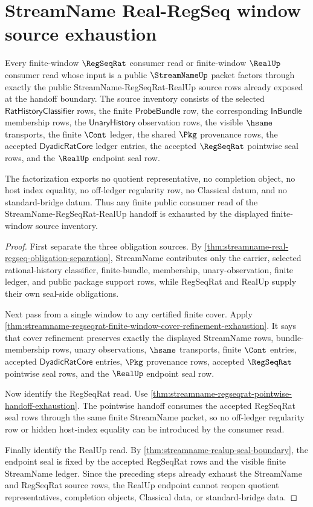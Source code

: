 \section{StreamName Real-RegSeq window source exhaustion}
\label{sec:streamname-real-regseq-window-source-exhaustion}

\begin{theorem}
\label{thm:streamname-real-regseq-window-source-exhaustion}
Every finite-window $\RegSeqRat$ consumer read or finite-window $\RealUp$
consumer read whose input is a public $\StreamNameUp$ packet factors through
exactly the public StreamName-RegSeqRat-RealUp source rows already exposed at
the handoff boundary. The source inventory consists of the selected
$\mathsf{RatHistoryClassifier}$ rows, the finite $\mathsf{ProbeBundle}$ row,
the corresponding $\mathsf{InBundle}$ membership rows, the
$\mathsf{UnaryHistory}$ observation rows, the visible $\hsame$ transports, the
finite $\Cont$ ledger, the shared $\Pkg$ provenance rows, the accepted
$\mathsf{DyadicRatCore}$ ledger entries, the accepted $\RegSeqRat$ pointwise
seal rows, and the $\RealUp$ endpoint seal row.

The factorization exports no quotient representative, no completion object, no
host index equality, no off-ledger regularity row, no Classical datum, and no
standard-bridge datum. Thus any finite public consumer read of the
StreamName-RegSeqRat-RealUp handoff is exhausted by the displayed finite-window
source inventory.
\end{theorem}
\begin{proof}
First separate the three obligation sources. By
\autoref{thm:streamname-real-regseq-obligation-separation}, StreamName
contributes only the carrier, selected rational-history classifier,
finite-bundle, membership, unary-observation, finite ledger, and public package
support rows, while RegSeqRat and RealUp supply their own seal-side
obligations.

Next pass from a single window to any certified finite cover. Apply
\autoref{thm:streamname-regseqrat-finite-window-cover-refinement-exhaustion}.
It says that cover refinement preserves exactly the displayed StreamName rows,
bundle-membership rows, unary observations, $\hsame$ transports, finite $\Cont$
entries, accepted $\mathsf{DyadicRatCore}$ entries, $\Pkg$ provenance rows,
accepted $\RegSeqRat$ pointwise seal rows, and the $\RealUp$ endpoint seal row.

Now identify the RegSeqRat read. Use
\autoref{thm:streamname-regseqrat-pointwise-handoff-exhaustion}. The pointwise
handoff consumes the accepted RegSeqRat seal rows through the same finite
StreamName packet, so no off-ledger regularity row or hidden host-index
equality can be introduced by the consumer read.

Finally identify the RealUp read. By
\autoref{thm:streamname-realup-seal-boundary}, the endpoint seal is fixed by
the accepted RegSeqRat rows and the visible finite StreamName ledger. Since the
preceding steps already exhaust the StreamName and RegSeqRat source rows, the
RealUp endpoint cannot reopen quotient representatives, completion objects,
Classical data, or standard-bridge data.
\end{proof}

